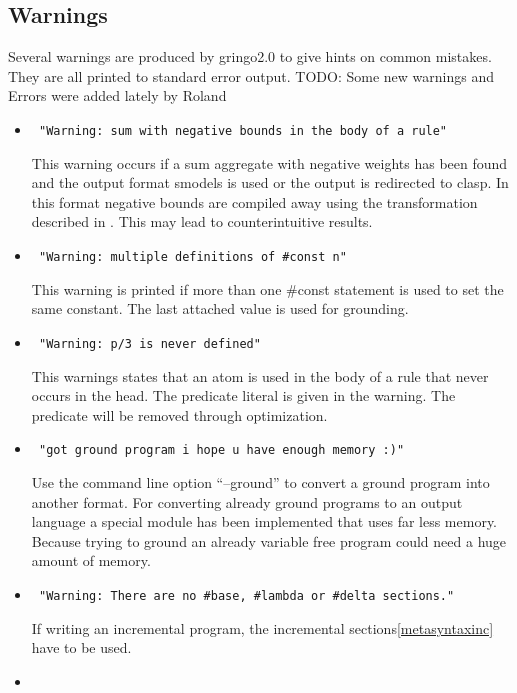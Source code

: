 \documentclass[a4paper,10pt]{article}
\begin{document}
\subsection{Warnings}
Several warnings are produced by gringo2.0 to give hints on common mistakes.
They are all printed to standard error output.
TODO: Some new warnings and Errors were added lately by Roland

\begin{itemize}
 \item 
\begin{verbatim}
 "Warning: sum with negative bounds in the body of a rule"
\end{verbatim}
This warning occurs if a sum aggregate with negative weights has been found and the output format smodels is used or the output is redirected to clasp. In this format negative bounds are compiled away using the transformation described in \cite{lparseManual}. This may lead to counterintuitive results.
 \item 
\begin{verbatim}
 "Warning: multiple definitions of #const n"
\end{verbatim}
This warning is printed if more than one \#const statement is used to set the same constant.
The last attached value is used for grounding.
\item
\begin{verbatim}
 "Warning: p/3 is never defined"
\end{verbatim}
This warnings states that an atom is used in the body of a rule that never occurs in the head.
The predicate literal is given in the warning. The predicate will be removed through optimization.
\item
\begin{verbatim}
 "got ground program i hope u have enough memory :)"
\end{verbatim}
Use the command line option ``--ground'' to convert a ground program into another format.
For converting already ground programs to an output language a special module has been implemented that uses far less memory. Because trying to ground an already variable free program could need a huge amount of memory.
\item
\begin{verbatim}
 "Warning: There are no #base, #lambda or #delta sections."
\end{verbatim}
If writing an incremental program, the incremental sections\ref{metasyntaxinc} have to be used.
\item
\begin{verbatim}

\end{verbatim}
\end{itemize}
\end{document}

